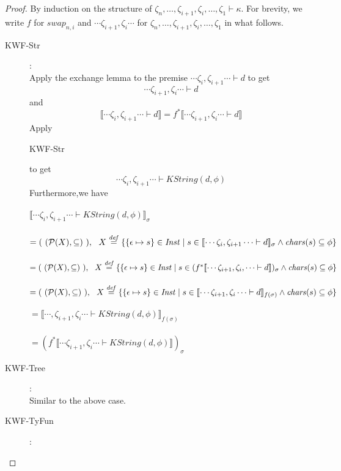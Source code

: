 \documentclass{article}
\newcommand{\sem}[1]{\llbracket #1 \rrbracket}
\newcommand{\defeq}{\overset{\mathit{def}}{=}}
\begin{document}
\begin{proof}
By induction on the structure of $\zeta_n,\ldots,\zeta_{i+1},\zeta_i,\ldots,\zeta_1 \vdash \kappa$.
For brevity, we write $f$ for $swap_{n,i}$ and $\cdots \zeta_{i+1},\zeta_i \cdots$ for $\zeta_n,\ldots,\zeta_{i+1},\zeta_{i},\ldots,\zeta_1$ in what follows.
\begin{description}
\item[KWF-Str]:~\\
Apply the exchange lemma to the premise $\cdots \zeta_{i},\zeta_{i+1} \cdots \vdash d$ to get $$\cdots \zeta_{i+1},\zeta_{i} \cdots \vdash d$$ and $$\sem{\cdots\zeta_i,\zeta_{i+1}\cdots \vdash d} = f^* \sem{\cdots\zeta_{i+1},\zeta_i\cdots \vdash d}$$ Apply \begin{sc}KWF-Str\end{sc} to get $$\cdots\zeta_{i},\zeta_{i+1}\cdots \vdash \mathit{KString}(d,\phi)$$
Furthermore,we have\\~\\
$\sem{\cdots \zeta_{i},\zeta_{i+1} \cdots \vdash \mathit{KString}(d,\phi)}_\sigma$\\~\\
$= (~(\mathcal P (X), \subseteq)~),~~\small{X \defeq \{ \{ \epsilon \mapsto s\} \in \mathit{Inst} \mid s \in \sem{\cdots \zeta_{i},\zeta_{i+1} \cdots \vdash d}_\sigma \wedge \mathit{chars}(s) \subseteq \phi \}}$\\~\\
$= (~(\mathcal P (X), \subseteq)~),~~\small{X \defeq \{ \{ \epsilon \mapsto s\} \in \mathit{Inst} \mid s \in (f^*\sem{\cdots\zeta_{i+1},\zeta_i,\cdots \vdash d})_\sigma \wedge \mathit{chars}(s) \subseteq \phi \}}$\\~\\
$= (~(\mathcal P (X), \subseteq)~),~~\small{X \defeq \{ \{ \epsilon \mapsto s\} \in \mathit{Inst} \mid s \in \sem{\cdots \zeta_{i+1},\zeta_i \cdots \vdash d}_{f(\sigma)} \wedge \mathit{chars}(s) \subseteq \phi \}}$\\~\\
$= \sem{\cdots,\zeta_{i+1},\zeta_i \cdots \vdash \mathit{KString}(d,\phi)}_{f(\sigma)}$\\~\\
$= (f^* \sem{\cdots \zeta_{i+1},\zeta_i \cdots \vdash \mathit{KString}(d,\phi)})_\sigma $
\item[KWF-Tree]:~\\
Similar to the above case.

\item[KWF-TyFun]:~\\ 


\end{description}
\end{proof}
\end{document}

